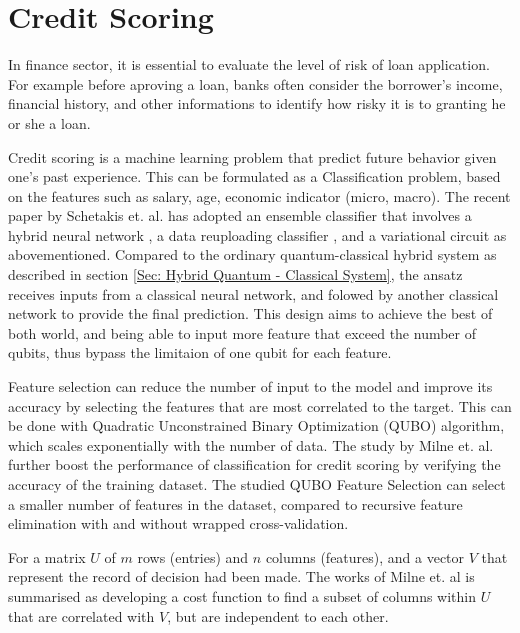\section{Credit Scoring}
In finance sector, it is essential to evaluate the level of risk of loan application.
For example before aproving a loan, banks often consider the borrower's income, financial history, and other informations to identify how risky it is to granting he or she a loan.

Credit scoring is a machine learning problem that predict future behavior given one's past experience.
This can be formulated as a Classification problem, based on the features such as salary, age, economic indicator (micro, macro).
The recent paper by Schetakis et. al. \cite{schetakisQuantumMachineLearning2022} has adopted an ensemble classifier that involves a hybrid neural network \cite{farhiClassificationQuantumNeural2018}, a data reuploading classifier \cite{perez-salinasOneQubitUniversal2021}, and a variational circuit as abovementioned.
Compared to the ordinary quantum-classical hybrid system as described in section \ref{Sec: Hybrid Quantum - Classical System}, the ansatz receives inputs from a classical neural network, and folowed by another classical network to provide the final prediction.
This design aims to achieve the best of both world, and being able to input more feature that exceed the number of qubits, thus bypass the limitaion of one qubit for each feature.

Feature selection can reduce the number of input to the model and improve its accuracy by selecting the features that are most correlated to the target.
This can be done with Quadratic Unconstrained Binary Optimization (QUBO) algorithm, which scales exponentially with the number of data.
The study by Milne et. al. \cite{milneOptimalFeatureSelection2017} further boost the performance of classification for credit scoring by verifying the accuracy of the training dataset.
The studied QUBO Feature Selection can select a smaller number of features in the dataset, compared to recursive feature elimination with and without wrapped cross-validation.

For a matrix $U$ of $m$ rows (entries) and $n$ columns (features), and a vector $V$ that represent the record of decision had been made.
The works of Milne et. al \cite{milneOptimalFeatureSelection2017} is summarised as developing a cost function to find a subset of columns within $U$ that are correlated with $V$, but are independent to each other.

